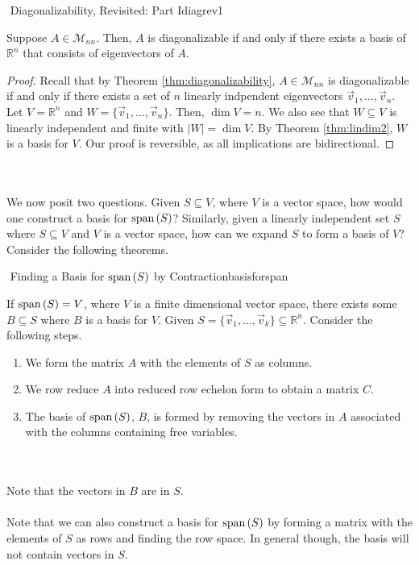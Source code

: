        \begin{theorem}{\Stop\,\,Diagonalizability, Revisited: Part I}{diagrev1}

            Suppose \(A\in\mathcal{M}_{nn}\). Then, \(A\) is diagonalizable if and only if there exists a basis of \(\mathbb{R}^n\) that consists of eigenvectors of \(A\).
            \begin{proof}
                Recall that by Theorem \ref{thm:diagonalizability}, \(A\in\mathcal{M}_{nn}\) is diagonalizable if and only if there exists a set of \(n\) linearly indpendent eigenvectors \(\vec{v}_1,\ldots,\vec{v}_n\). Let \(V=\mathbb{R}^n\) and \(W=\{\vec{v}_1,\ldots,\vec{v}_n\}\). Then, \(\dim V=n\). We also see that \(W\subseteq V\) is linearly independent and finite with \(|W|=\dim V\). By Theorem \ref{thm:lindim2}, \(W\) is a basis for \(V\). Our proof is reversible, as all implications are bidirectional.
            \end{proof}

        \end{theorem}
        \pagebreak
        \vphantom
        \\
        \\
        We now posit two questions. Given \(S\subseteq V\), where \(V\) is a vector space, how would one construct a basis for \(\text{span\,}(S)\)? Similarly, given a linearly independent set \(S\) where \(S\subseteq V\) and \(V\) is a vector space, how can we expand \(S\) to form a basis of \(V\)? Consider the following theorems.
        \begin{theorem}{\Stop\,\,Finding a Basis for \(\text{span\,}(S)\) by Contraction}{basisforspan}
            
            If \(\text{span\,}(S)=V\), where \(V\) is a finite dimensional vector space, there exists some \(B\subseteq S\) where \(B\) is a basis for \(V\). Given \(S=\{\vec{v}_1,\ldots,\vec{v}_k\}\subseteq\mathbb{R}^n\). Consider the following steps.
            \begin{enumerate}
                \item We form the matrix \(A\) with the elements of \(S\) as columns.
                \item We row reduce \(A\) into reduced row echelon form to obtain a matrix \(C\).
                \item The basis of \(\text{span\,}(S)\), \(B\), is formed by removing the vectors in \(A\) associated with the columns containing free variables.
            \end{enumerate}
            \vphantom
            \\
            \\
            Note that the vectors in \(B\) are in \(S\).
            \\
            \\
            Note that we can also construct a basis for \(\text{span\,}(S)\) by forming a matrix with the elements of \(S\) as rows and finding the row space. In general though, the basis will not contain vectors in \(S\).

        \end{theorem}
